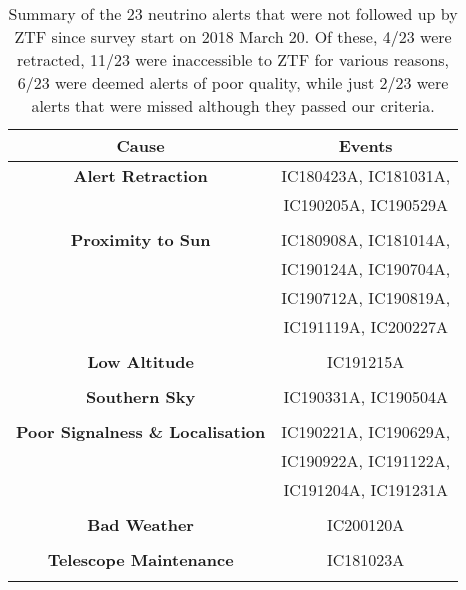 \begin{table}
	\centering
	\begin{tabular}{||c c||} 
		\hline
		\textbf{Cause} & \textbf{Events} \\
		\hline
		\textbf{Alert Retraction} & IC180423A\cite{IC180423A}, IC181031A\cite{IC181031A},\\ &IC190205A\cite{IC190205A}, IC190529A\cite{IC190529A}\\
		&\\
		\hline
		\textbf{Proximity to Sun} & IC180908A\cite{IC180908A}, IC181014A\cite{IC181014A},\\ &IC190124A\cite{IC190124A}, IC190704A\cite{IC190704A},\\
		& IC190712A\cite{IC190712A}, IC190819A\cite{IC190819A},\\
		& IC191119A\cite{IC191119A}, IC200227A\cite{IC200227A}\\
		&\\
		\textbf{Low Altitude} & IC191215A\cite{IC191215A}\\
		&\\
		\textbf{Southern Sky} & IC190331A\cite{IC190331A}, IC190504A\cite{IC190504A}\\
		&\\
		\hline
		\textbf{Poor Signalness \& Localisation} &
		IC190221A\cite{IC190221A}, IC190629A\cite{IC190629A}, \\
		&IC190922A\cite{IC190922A}, IC191122A\cite{IC191122A}, \\
		&IC191204A\cite{IC191204A}, IC191231A\cite{IC191231A}\\
		&\\
		\hline
		\textbf{Bad Weather} & IC200120A\cite{IC200120A,IC200120A_2}\\
		&\\
		\textbf{Telescope Maintenance} & IC181023A\cite{IC181023A}\\
		&\\
		\hline
	\end{tabular}
	\caption{Summary of the 23 neutrino alerts that were not followed up by ZTF since survey start on 2018 March 20. Of these, 4/23 were retracted, 11/23 were inaccessible to ZTF for various reasons, 6/23 were deemed alerts of poor quality, while just 2/23 were alerts that were missed although they passed our criteria.}
	\label{tab:nu_non_observed}
\end{table}

